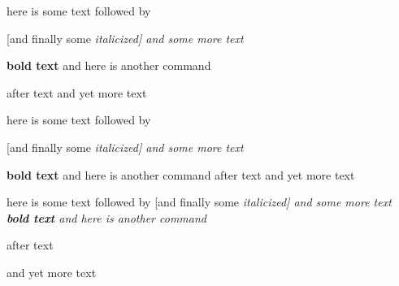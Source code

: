here is some text followed by

[and finally some \itshape{italicized}] and
some more text

\textbf{bold text} and here is another command

 after text  and yet more text

here is some text followed by

[and finally some \itshape{italicized}] and
some more text

\textbf{bold text} and here is another command  after text  and yet more text

here is some text followed by [and finally some \itshape{italicized}] and
some more text \textbf{bold text} and here is another command

 after text

 and yet more text
